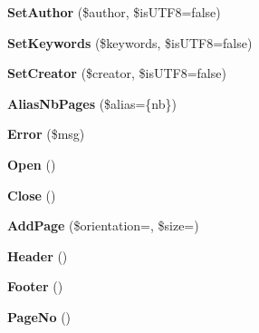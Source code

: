 \begin{DoxyCompactItemize}
\item 
\hypertarget{classFPDF_a2448f729ffdee950dca638910a31a206}{}{\bfseries Set\+Author} (\$author, \$is\+U\+T\+F8=false)\label{classFPDF_a2448f729ffdee950dca638910a31a206}

\item 
\hypertarget{classFPDF_a97c034e7f4c04395a54f09f582544a97}{}{\bfseries Set\+Keywords} (\$keywords, \$is\+U\+T\+F8=false)\label{classFPDF_a97c034e7f4c04395a54f09f582544a97}

\item 
\hypertarget{classFPDF_ad528c02fc9104993d5b8c4d3f4a5ae00}{}{\bfseries Set\+Creator} (\$creator, \$is\+U\+T\+F8=false)\label{classFPDF_ad528c02fc9104993d5b8c4d3f4a5ae00}

\item 
\hypertarget{classFPDF_a519cf01024f5981364ec7cd2d5281253}{}{\bfseries Alias\+Nb\+Pages} (\$alias=\textquotesingle{}\{nb\}\textquotesingle{})\label{classFPDF_a519cf01024f5981364ec7cd2d5281253}

\item 
\hypertarget{classFPDF_abbf9af8630c425b22b9199cc906ee1bb}{}{\bfseries Error} (\$msg)\label{classFPDF_abbf9af8630c425b22b9199cc906ee1bb}

\item 
\hypertarget{classFPDF_a6361408b654aa8ec619489c600492893}{}{\bfseries Open} ()\label{classFPDF_a6361408b654aa8ec619489c600492893}

\item 
\hypertarget{classFPDF_af6bcdd2acb114191b61065e85ff0b62c}{}{\bfseries Close} ()\label{classFPDF_af6bcdd2acb114191b61065e85ff0b62c}

\item 
\hypertarget{classFPDF_a121a87a0cf4fcc43eb6972d40a4d54b1}{}{\bfseries Add\+Page} (\$orientation=\textquotesingle{}\textquotesingle{}, \$size=\textquotesingle{}\textquotesingle{})\label{classFPDF_a121a87a0cf4fcc43eb6972d40a4d54b1}

\item 
\hypertarget{classFPDF_ab1bedba6d1753b9e3f18ed3820743fd6}{}{\bfseries Header} ()\label{classFPDF_ab1bedba6d1753b9e3f18ed3820743fd6}

\item 
\hypertarget{classFPDF_aaa8da01869c5e5a75ff9150016dad08d}{}{\bfseries Footer} ()\label{classFPDF_aaa8da01869c5e5a75ff9150016dad08d}

\item 
\hypertarget{classFPDF_af97a0239f79f597b5c88cc68b385f7af}{}{\bfseries Page\+No} ()\label{classFPDF_af97a0239f79f597b5c88cc68b385f7af}


\end{DoxyCompactItemize}
